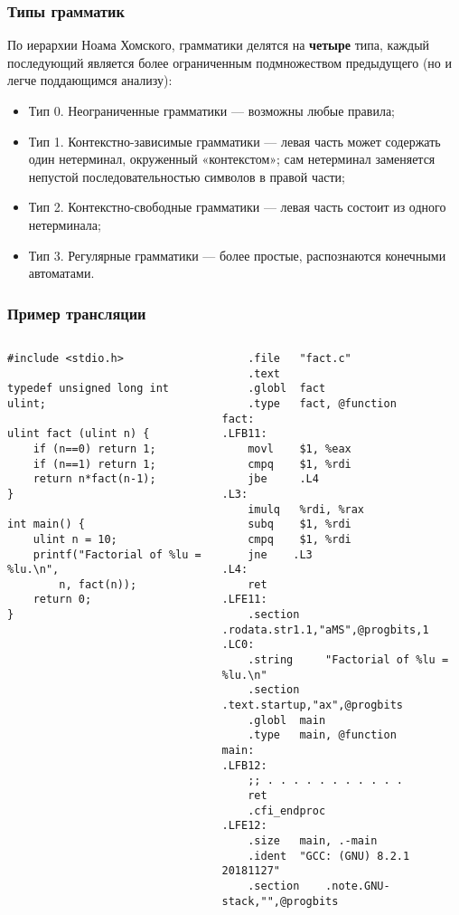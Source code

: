 \documentclass[10pt]{beamer}
\begin{document}
\begin{frame}
  \frametitle{Типы грамматик}
  По иерархии Ноама Хомского, грамматики делятся на \textbf{четыре} типа, каждый последующий является более ограниченным подмножеством предыдущего (но и легче поддающимся анализу):
  \begin{itemize}
    \item Тип 0. Неограниченные грамматики — возможны любые правила;
    \item Тип 1. Контекстно-зависимые грамматики — левая часть может содержать один нетерминал, окруженный «контекстом»; сам нетерминал заменяется непустой последовательностью символов в правой части;
    \item Тип 2. Контекстно-свободные грамматики — левая часть состоит из одного нетерминала;
    \item Тип 3. Регулярные грамматики — более простые, распознаются конечными автоматами.
  \end{itemize}
\end{frame}

\begin{frame}[fragile]
  \frametitle{Пример трансляции}
   \begin{columns}
     \begin{column}{0.5\textwidth}
 \begin{verbatim}
#include <stdio.h>

typedef unsigned long int ulint;

ulint fact (ulint n) {
    if (n==0) return 1;
    if (n==1) return 1;
    return n*fact(n-1);
}

int main() {
    ulint n = 10;
    printf("Factorial of %lu = %lu.\n",
        n, fact(n));
    return 0;
}
 \end{verbatim}
     \end{column}
      \begin{column}{0.5\textwidth}
\begin{verbatim}
	.file   "fact.c"
	.text
	.globl  fact
	.type   fact, @function
fact:
.LFB11:
	movl    $1, %eax
	cmpq    $1, %rdi
	jbe     .L4
.L3:
	imulq   %rdi, %rax
	subq    $1, %rdi
	cmpq    $1, %rdi
	jne    .L3
.L4:
	ret
.LFE11:
	.section    .rodata.str1.1,"aMS",@progbits,1
.LC0:
	.string     "Factorial of %lu = %lu.\n"
	.section    .text.startup,"ax",@progbits
	.globl  main
	.type   main, @function
main:
.LFB12:
	;; . . . . . . . . . . .
	ret
	.cfi_endproc
.LFE12:
	.size   main, .-main
	.ident  "GCC: (GNU) 8.2.1 20181127"
	.section    .note.GNU-stack,"",@progbits
\end{verbatim}
      \end{column}
    \end{columns}
 \end{frame}
\end{document}

